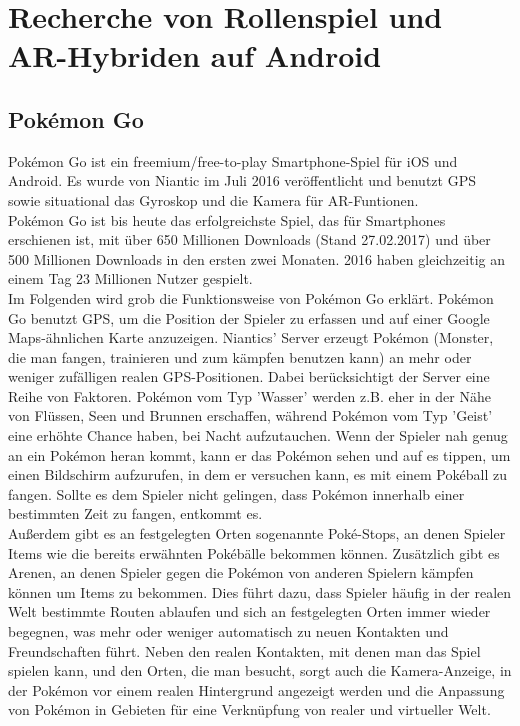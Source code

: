 \documentclass[extern,palatino]{cgBA}
\begin{document}
	\section{Recherche von Rollenspiel und AR-Hybriden auf Android}
	\subsection{Pokémon Go}
	Pokémon Go ist ein freemium/free-to-play Smartphone-Spiel für iOS und Android. Es wurde von Niantic im Juli 2016 veröffentlicht und benutzt GPS sowie situational das Gyroskop und die Kamera für AR-Funtionen.
	\\Pokémon Go ist bis heute das erfolgreichste Spiel, das für Smartphones erschienen ist, mit über 650 Millionen Downloads (Stand 27.02.2017) und über 500 Millionen Downloads in den ersten zwei  Monaten.%
	2016 haben gleichzeitig an einem Tag 23 Millionen Nutzer gespielt.
	\\
	Im Folgenden wird grob die Funktionsweise von Pokémon Go erklärt. Pokémon Go benutzt GPS, um die Position der Spieler zu erfassen und auf einer Google Maps-ähnlichen Karte anzuzeigen.
	Niantics' Server erzeugt Pokémon (Monster, die man fangen, trainieren und zum kämpfen benutzen kann) an mehr oder weniger zufälligen realen GPS-Positionen. Dabei berücksichtigt der Server eine Reihe von Faktoren. Pokémon vom Typ 'Wasser' werden z.B. eher in der Nähe von Flüssen, Seen und Brunnen erschaffen, während Pokémon vom Typ 'Geist' eine erhöhte Chance haben, bei Nacht aufzutauchen. Wenn der Spieler nah genug an ein Pokémon heran kommt, kann er das Pokémon sehen und auf es tippen, um einen Bildschirm aufzurufen, in dem er versuchen kann, es mit einem Pokéball zu fangen. Sollte es dem Spieler nicht gelingen, dass Pokémon innerhalb einer bestimmten Zeit zu fangen, entkommt es.
	\\Außerdem gibt es an festgelegten Orten sogenannte Poké-Stops, an denen Spieler Items wie die bereits erwähnten Pokébälle bekommen können. Zusätzlich gibt es Arenen, an denen Spieler gegen die Pokémon von anderen Spielern kämpfen können um Items zu bekommen. Dies führt dazu, dass Spieler häufig in der realen Welt bestimmte Routen ablaufen und sich an festgelegten Orten immer wieder begegnen, was mehr oder weniger automatisch zu neuen Kontakten und Freundschaften führt. Neben den realen Kontakten, mit denen man das Spiel spielen kann, und den Orten, die man besucht, sorgt auch die Kamera-Anzeige, in der Pokémon vor einem realen Hintergrund angezeigt werden und die Anpassung von Pokémon in Gebieten für eine Verknüpfung von realer und virtueller Welt. 
\end{document}
